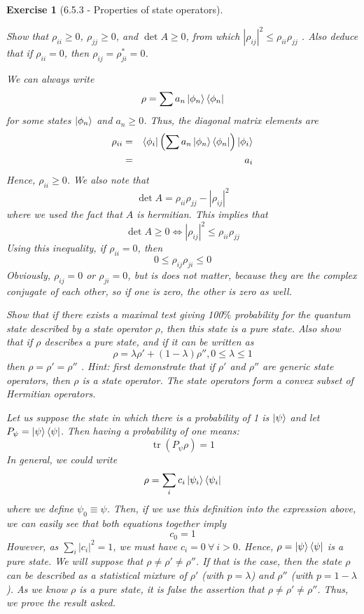 \documentclass[12pt]{article}
\def\be{\begin{equation}}
\def\ee{\end{equation}}
\def\bea{\begin{eqnarray*}}
\def\eea{\end{eqnarray*}}
\def\l{\left}
\def\r{\right}
\newtheorem{exercise}{Exercise}
\DeclareMathOperator{\tr}{tr}
\begin{document}
	\begin{exercise}[6.5.3 - Properties of state operators]
		\begin{exercises}
			\item Show that $\rho_{ii}\geq 0$, $\rho_{jj}\geq 0$, and $\det{A} \geq 0$, from which $|\rho_{ij}|^2 \leq \rho_{ii} \rho_{jj}$ . Also deduce that if $\rho_{ii} = 0$, then $\rho_{ij} = \rho_{ji}^* = 0$.
			\begin{multianswer}
				We can always write
				\be
					\rho = \sum a_n \ket{\phi_n}\bra{\phi_n}
				\ee
				for some states $\ket{\phi_n}$ and $a_n\geq 0$. Thus, the diagonal matrix elements are
				\bea
					\rho_{ii} &=& \bra{\phi_i} \l(\sum a_n \ket{\phi_n}\bra{\phi_n}\r) \ket{\phi_i} \\
						&=& a_i 
				\eea
				Hence, $\rho_{ii}\geq0$. We also note that
				\be
					\det{A} = \rho_{ii}\rho_{jj} - |\rho_{ij}|^2
				\ee
				where we used the fact that $A$ is hermitian. This implies that
				\be
					\det{A} \geq 0 \iff |\rho_{ij}|^2 \leq \rho_{ii}\rho_{jj}
				\ee
				Using this inequality, if $\rho_{ii}=0$, then
				\be
					0 \leq \rho_{ij}\rho_{ji} \leq 0
				\ee
				Obviously, $\rho_{ij}=0$ or $\rho_{ji}=0$, but is does not matter, because they are the complex conjugate of each other, so if one is zero, the other is zero as well.				
			\end{multianswer}
			
			\item Show that if there exists a maximal test giving 100$\%$ probability for the quantum state described
			by a state operator $\rho$, then this state is a pure state. Also show that if $\rho$ describes a pure state,
			and if it can be written as
			\be
				\rho = \lambda\rho' + (1 - \lambda)\rho'', 0 \leq \lambda 
				\leq 1
			\ee
			then $\rho=\rho'=\rho''$ . Hint: first demonstrate that if $\rho'$ and $\rho''$ are generic state operators, then $\rho$ is
			a state operator. The state operators form a convex subset of Hermitian operators.
			\begin{multianswer}[true]
				Let us suppose the state in which there is a probability of 1 is $\ket{\psi}$ and let $P_\psi=\ket{\psi}\bra{\psi}$. Then having a probability of one means:
				\be
					\tr\l( P_\psi\rho\r) = 1
				\ee
				In general, we could write
				\be
					\rho = \sum_i c_i \ket{\psi_i}\bra{\psi_i}
				\ee
				where we define $\psi_0\equiv\psi$. Then, if we use this definition into the expression above, we can easily see that both equations together imply
				\be
					c_0 = 1
				\ee
				However, as $\sum_i |c_i|^2 = 1$, we must have $c_i=0\ \forall\ i>0$. Hence, $\rho=\ket{\psi}\bra{\psi}$ is a pure state. We will suppose that $\rho\not=\rho'\not=\rho''$. If that is the case, then the state $\rho$ can be described as a statistical mixture of $\rho'$ (with $p=\lambda$) and $\rho''$ (with $p=1-\lambda$). As we know $\rho$ is a pure state, it is false the assertion that $\rho\not=\rho'\not=\rho''$. Thus, we prove the result asked.  
			\end{multianswer}
		\end{exercises}
	\end{exercise}
	
\end{document}
